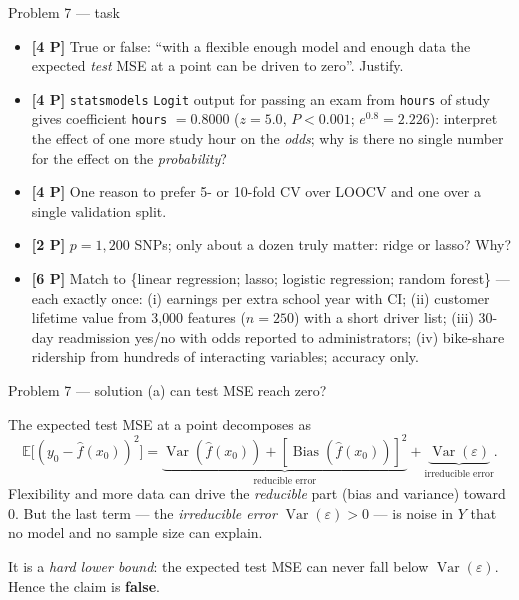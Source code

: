 \documentclass[aspectratio=169,11pt]{beamer}
\begin{document}
\begin{frame}{Problem 7 --- task}
  \begin{exercise}
    \begin{itemize}
      \item[(a)] \textbf{[4 P]} True or false: ``with a flexible enough model and enough data the
        expected \emph{test} MSE at a point can be driven to zero''. Justify.
      \item[(b)] \textbf{[4 P]} \texttt{statsmodels} \texttt{Logit} output for passing an exam
        from \texttt{hours} of study gives coefficient \texttt{hours} $=0.8000$
        ($z=5.0$, $P<0.001$; $e^{0.8}=2.226$): interpret the effect of one more study hour on the
        \emph{odds}; why is there no single number for the effect on the \emph{probability}?
      \item[(c)] \textbf{[4 P]} One reason to prefer 5- or 10-fold CV over LOOCV and one over a
        single validation split.
      \item[(d)] \textbf{[2 P]} $p=1{,}200$ SNPs; only about a dozen truly matter:
        ridge or lasso? Why?
      \item[(e)] \textbf{[6 P]} Match to \{linear regression; lasso; logistic regression;
        random forest\} --- each exactly once: (i) earnings per extra school year with CI;
        (ii) customer lifetime value from 3{,}000 features ($n=250$) with a short driver list;
        (iii) 30-day readmission yes/no with odds reported to administrators;
        (iv) bike-share ridership from hundreds of interacting variables; accuracy only.
    \end{itemize}
  \end{exercise}
  \vspace{2pt}{\scriptsize\itshape Lecture slides: Chapters 2--6 (Lectures 1--8).}
\end{frame}

\begin{frame}{Problem 7 --- solution (a) can test MSE reach zero?}
  \begin{solutionbox}
    The expected test MSE at a point decomposes as
    \[
      \mathbb{E}\bigl[(y_0-\hat f(x_0))^2\bigr]
      =\underbrace{\operatorname{Var}(\hat f(x_0))+[\operatorname{Bias}(\hat f(x_0))]^2}_{\text{reducible error}}
      +\underbrace{\operatorname{Var}(\varepsilon)}_{\text{irreducible error}}.
    \]
    Flexibility and more data can drive the \emph{reducible} part (bias and variance) toward $0$.
    But the last term --- the \emph{irreducible error} $\operatorname{Var}(\varepsilon)>0$ --- is
    noise in $Y$ that no model and no sample size can explain.
    \medskip

    It is a \emph{hard lower bound}: the expected test MSE can never fall below
    $\operatorname{Var}(\varepsilon)$. Hence the claim is \textbf{false}.
  \end{solutionbox}
\end{frame}
\end{document}
